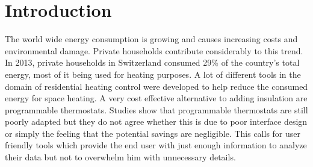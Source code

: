 
\chapter{Introduction}
\label{sec:introduction}



The world wide energy consumption is growing and causes increasing costs and environmental damage.
Private households contribute considerably to this trend.
In 2013, private households in Switzerland consumed 29\% of the country's total energy\cite{schweizerischeGesamtenergiestatistik2013}, most of it being used for heating purposes\cite{analyseEnergieverbrauchVerwendungszwecke2013}.
A lot of different tools in the domain of residential heating control were developed to help reduce the consumed energy for space heating.
A very cost effective alternative to adding insulation are programmable thermostats.
Studies show that programmable thermostats are still poorly adapted but they do not agree whether this is due to poor interface design or simply the feeling that the potential savings are negligible.
This calls for user friendly tools which provide the end user with just enough information to analyze their data but not to overwhelm him with unnecessary details.


